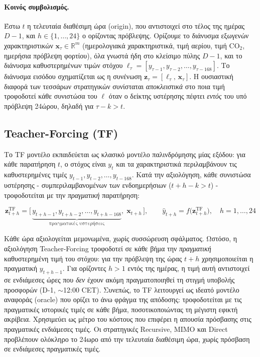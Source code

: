 \paragraph{Κοινός συμβολισμός.} Έστω $t$ η τελευταία διαθέσιμη ώρα (origin), που
αντιστοιχεί στο τέλος της ημέρας $D-1$, και $h \in \{1, \ldots, 24\}$ ο ορίζοντας
πρόβλεψης. Ορίζουμε το διάνυσμα εξωγενών χαρακτηριστικών $\mathbf{x}_\tau \in
\mathbb{R}^{m}$ (ημερολογιακά χαρακτηριστικά, τιμή αερίου, τιμή $\mathrm{CO_2}$,
ημερήσια πρόβλεψη φορτίου), όλα γνωστά ήδη στο κλείσιμο πύλης $D-1$, και το διάνυσμα
καθυστερημένων τιμών στόχου $\boldsymbol{\ell}_\tau = \left[y_{\tau-1}, y_{\tau-2},
\ldots, y_{\tau-168}\right]$. Το διάνυσμα εισόδου σχηματίζεται ως η συνένωση
$\mathbf{z}_\tau = \left[\boldsymbol{\ell}_\tau,\, \mathbf{x}_\tau\right]$. Η ουσιαστική
διαφορά των τεσσάρων στρατηγικών συνίσταται \emph{αποκλειστικά} στο ποια τιμή
τροφοδοτεί κάθε συνιστώσα του $\boldsymbol{\ell}$ όταν ο δείκτης υστέρησης πέφτει
\emph{εντός} του υπό πρόβλεψη 24ώρου, δηλαδή για $\tau - k > t$.


\subsection{Teacher-Forcing (TF)}

Το TF μοντέλο εκπαιδεύεται ως κλασικό μοντέλο παλινδρόμησης μίας εξόδου: για κάθε
παρατήρηση $t$, ο στόχος είναι $y_t$ και τα χαρακτηριστικά περιλαμβάνουν τις
καθυστερημένες τιμές $y_{t-1}, y_{t-2}, \ldots, y_{t-168}$. Κατά την αξιολόγηση, κάθε
συνιστώσα υστέρησης - συμπεριλαμβανομένων των ενδοημερήσιων ($t+h-k > t$) -
τροφοδοτείται με την \emph{πραγματική} παρατήρηση:

\begin{equation}
  \mathbf{z}^{\mathrm{TF}}_{t+h} = \big[\,\underbrace{y_{t+h-1}, y_{t+h-2}, \ldots,
  y_{t+h-168}}_{\text{πραγματικές υστερήσεις}},\; \mathbf{x}_{t+h}\,\big], \qquad
  \hat{y}_{t+h} = f\!\big(\mathbf{z}^{\mathrm{TF}}_{t+h}\big),
  \quad h = 1, \ldots, 24
  \label{eq:tf}
\end{equation}

Κάθε ώρα αξιολογείται μεμονωμένα, χωρίς συσσώρευση σφάλματος. Ωστόσο, η
αξιολόγηση Teacher-Forcing τροφοδοτεί σε κάθε βήμα την \emph{πραγματική}
καθυστερημένη τιμή του στόχου: για την πρόβλεψη της ώρας $t+h$ χρησιμοποιείται η
πραγματική $y_{t+h-1}$. Για ορίζοντες $h>1$ εντός της ημέρας, η τιμή αυτή
αντιστοιχεί σε ενδιάμεσες ώρες που \emph{δεν} έχουν ακόμη πραγματοποιηθεί τη
στιγμή υποβολής προσφορών (D-1, $\sim$12:00 CET). Συνεπώς, το TF λειτουργεί ως ιδεατό
μοντέλο αναφοράς (oracle) που ορίζει το άνω φράγμα της απόδοσης: τροφοδοτείται με τις
πραγματικές ιστορικές τιμές σε κάθε βήμα, ποσοτικοποιώντας τη μέγιστη εφικτή ακρίβεια. Χρησιμεύει
ως μέτρο του κόστους που επιφέρει η απουσία πρόσβασης στις πραγματικές ενδιάμεσες τιμές. Οι
στρατηγικές Recursive, MIMO και Direct προβλέπουν ολόκληρο το 24ωρο από την τελευταία
διαθέσιμη ώρα, χωρίς πρόσβαση σε ενδιάμεσες πραγματικές τιμές.


